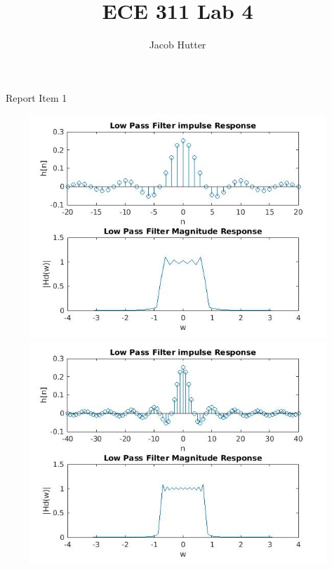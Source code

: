 \documentclass{article}
\author{Jacob Hutter}
\title{ECE 311 Lab 4}
\begin{document}
\maketitle
\ Report Item 1

\begin{figure}[H]
\includegraphics[scale = .5]{1_lpf_20}
\includegraphics[scale = .5]{1_lpf_40}
\end{figure}
\end{document}
